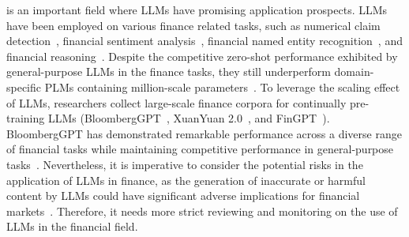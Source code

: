 {{{
is an important field where LLMs have promising application prospects. 
LLMs have been employed on various finance related tasks, such as numerical claim detection~\cite{Shah-arxiv-2023-Zero}, financial sentiment analysis~\cite{Araci-arxiv-2023-FinBERT}, financial named entity recognition~\cite{Alvarado-ALTA-2015-Domain}, and financial reasoning~\cite{Son-arxiv-2023-Beyond}.
Despite the competitive zero-shot performance exhibited by general-purpose LLMs in the finance tasks, they still underperform domain-specific PLMs containing million-scale  parameters~\cite{Shah-arxiv-2023-Zero}.
To leverage the scaling effect of LLMs, researchers collect large-scale finance corpora for continually pre-training LLMs (\eg BloombergGPT~\cite{wu-arxiv-2023-bloomberggpt}, XuanYuan 2.0~\cite{zhang-arxiv-2023-xuanyuan}, and FinGPT~\cite{Yang-2023-arxiv-FinGPT}).
BloombergGPT has demonstrated remarkable performance across a diverse range of financial tasks while maintaining competitive performance in general-purpose tasks~\cite{wu-arxiv-2023-bloomberggpt}.
Nevertheless, it is imperative to consider the potential risks in the application of LLMs in finance, as the generation of inaccurate or harmful content by LLMs could have significant adverse implications for financial markets~\cite{wu-arxiv-2023-bloomberggpt}.
Therefore, it needs more strict reviewing and monitoring on the use of LLMs in the financial field. 


}}}
